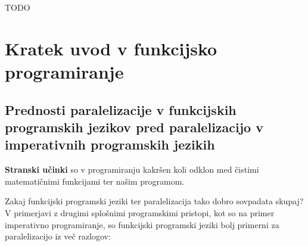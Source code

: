 \documentclass[mat1, tisk]{fmfdelo}
\begin{document}
TODO

\section{Kratek uvod v funkcijsko programiranje}

\subsection{Prednosti paralelizacije v funkcijskih programskih jezikov pred paralelizacijo v imperativnih programskih jezikih}

\begin{definicija}
  \textbf{Stranski učinki} so v programiranju kakršen koli odklon med čistimi matematičnimi funkcijami ter našim programom.
\end{definicija}

Zakaj funkcijski programski jeziki ter paralelizacija tako dobro sovpadata skupaj?
V primerjavi z drugimi splošnimi programskimi pristopi, kot so na primer imperativno programiranje, 
so funkcijski programski jeziki bolj primerni za paralelizacijo iz več razlogov:
\end{document}

